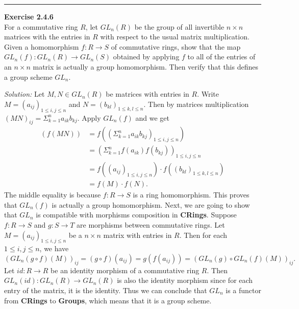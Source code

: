 \documentclass[a4paper, 12pt]{article}
\newenvironment{problem}[2][Exercise]
    { \begin{mdframed}[backgroundcolor=gray!20] \textbf{#1 #2} \\}
    {  \end{mdframed}}
\newenvironment{solution}
    {\textit{Solution:}}
    {}
\begin{document}
\noindent\rule{7in}{2.8pt}
\begin{problem}{2.4.6}
For a commutative ring \(R\), let \(GL_n(R)\) be the group of all invertible \(n\times n\) matrices with the entries in \(R\) with respect to the usual matrix multiplication. 
Given a homomorphism \(f:R\rightarrow S\) of commutative rings, show that the map \(GL_n(f):GL_n(R)\rightarrow GL_n(S)\) obtained by applying \(f\) to all of the entries of an \(n\times n\) matrix 
is actually a group homomorphism. Then verify that this defines a group scheme \(GL_n\).
\end{problem}
\begin{solution}
Let \(M,N\in GL_n(R)\) be matrices with entries in \(R\). Write \(M=(a_{ij})_{1\leq i,j\leq n}\) and \(N=(b_{kl})_{1\leq k,l\leq n}\). Then by matrices multiplication \((MN)_{ij}=\Sigma_{k=1}^n a_{ik}b_{kj}\). Apply \(GL_n(f)\) and we get 
\begin{align*}
(f(MN)) & =f((\Sigma_{k=1}^n a_{ik}b_{kj})_{1\leq i,j\leq n})\\ 
        & =(\Sigma_{k=1}^n f(a_{ik})f(b_{kj}))_{1\leq i,j\leq n}\\ 
        & =f((a_{ij})_{1\leq i,j\leq n})\cdot f((b_{kl})_{1\leq k,l\leq n})\\ 
        & =f(M)\cdot f(N).
\end{align*}
The middle equality is because \(f:R\rightarrow S\) is a ring homomorphism. This proves that \(GL_n(f)\) is actually a group homomorphism. 
Next, we are going to show that \(GL_n\) is compatible with morphisms composition in \textbf{CRings}. Suppose \(f:R\rightarrow S\) and \(g:S\rightarrow T\) are morphisms between commutative rings. 
Let \(M=(a_{ij})_{1\leq i,j\leq n}\) be a \(n\times n\) matrix with entries in \(R\). Then for each \(1\leq i,j\leq n\), we have 
$$(GL_n(g\circ f)(M))_{ij}=(g\circ f)(a_{ij})=g(f(a_{ij}))=(GL_n(g)\circ GL_n(f)(M))_{ij}.$$
Let \(id:R\rightarrow R\) be an identity morphism of a commutative ring \(R\). Then \(GL_n(id):GL_n(R)\rightarrow GL_n(R)\) is also the identity morphism since for each entry of the matrix, it is the identity. Thus we can conclude that 
\(GL_n\) is a functor from \textbf{CRings} to \textbf{Groups}, which means that it is a group scheme. 
\end{solution}
\end{document}
